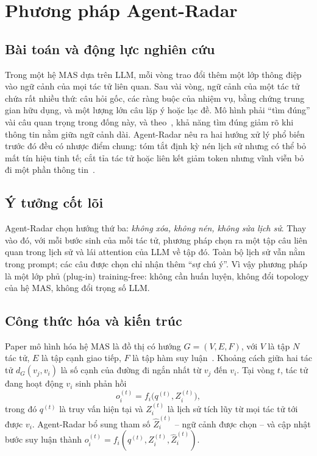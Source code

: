 \section{Phương pháp Agent-Radar}\label{sec:agentradar}

\subsection{Bài toán và động lực nghiên cứu}
Trong một hệ MAS dựa trên LLM, mỗi vòng trao đổi thêm một lớp thông điệp vào ngữ cảnh của mọi tác tử liên quan. Sau vài vòng, ngữ cảnh của một tác tử chứa rất nhiều thứ: câu hỏi gốc, các ràng buộc của nhiệm vụ, bằng chứng trung gian hữu dụng, và một lượng lớn câu lặp ý hoặc lạc đề. Mô hình phải ``tìm đúng'' vài câu quan trọng trong đống này, và theo~\cite{liu2024lost}, khả năng tìm đúng giảm rõ khi thông tin nằm giữa ngữ cảnh dài. Agent-Radar nêu ra hai hướng xử lý phổ biến trước đó đều có nhược điểm chung: tóm tắt định kỳ nén lịch sử nhưng có thể bỏ mất tín hiệu tinh tế; cắt tỉa tác tử hoặc liên kết giảm token nhưng vĩnh viễn bỏ đi một phần thông tin~\cite{agentradar2026}.

\subsection{Ý tưởng cốt lõi}
Agent-Radar chọn hướng thứ ba: \emph{không xóa, không nén, không sửa lịch sử}. Thay vào đó, với mỗi bước sinh của mỗi tác tử, phương pháp chọn ra một tập câu liên quan trong lịch sử và lái attention của LLM về tập đó. Toàn bộ lịch sử vẫn nằm trong prompt; các câu được chọn chỉ nhận thêm ``sự chú ý''. Vì vậy phương pháp là một lớp phủ (plug-in) training-free: không cần huấn luyện, không đổi topology của hệ MAS, không đổi trọng số LLM.

\subsection{Công thức hóa và kiến trúc}
Paper mô hình hóa hệ MAS là đồ thị có hướng $G = (V, E, F)$, với $V$ là tập $N$ tác tử, $E$ là tập cạnh giao tiếp, $F$ là tập hàm suy luận~\cite{agentradar2026}. Khoảng cách giữa hai tác tử $d_G(v_j, v_i)$ là số cạnh của đường đi ngắn nhất từ $v_j$ đến $v_i$. Tại vòng $t$, tác tử đang hoạt động $v_i$ sinh phản hồi
\begin{equation}
o^{(t)}_i = f_i\big(q^{(t)}, Z^{(t)}_i\big),
\label{eq:ar-infer}
\end{equation}
trong đó $q^{(t)}$ là truy vấn hiện tại và $Z^{(t)}_i$ là lịch sử tích lũy từ mọi tác tử tới được $v_i$. Agent-Radar bổ sung tham số $\hat{Z}^{(t)}_i$ -- ngữ cảnh được chọn -- và cập nhật bước suy luận thành $o^{(t)}_i = f_i(q^{(t)}, Z^{(t)}_i, \hat{Z}^{(t)}_i)$.

